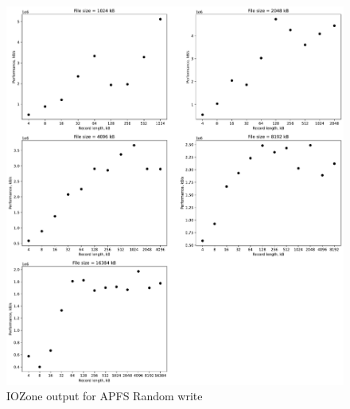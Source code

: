 \begin{figure}[!htb]
	\label{fig:app_bench_fapfsrnd_write}
	\begin{center}
		\includegraphics[width=1.0\textwidth]{figures/benchmarking/local/Random write.pdf}
	\end{center}
	\caption{IOZone output for APFS Random write}
\end{figure}

